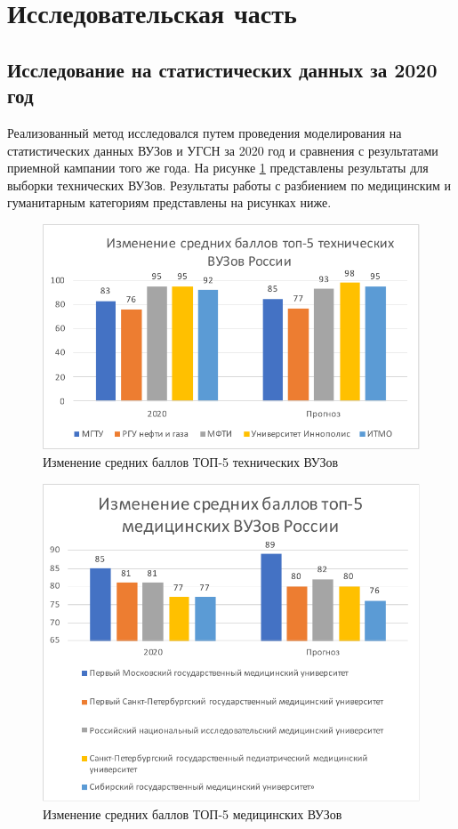 \section{Исследовательская часть}

\subsection{Исследование на статистических данных за 2020 год}

Реализованный метод исследовался путем проведения моделирования на статистических данных ВУЗов и УГСН за 2020 год и сравнения с результатами приемной кампании того же года. На рисунке \ref{top5tech} представлены результаты для выборки технических ВУЗов. Результаты работы с разбиением по медицинским и гуманитарным категориям представлены на рисунках ниже.

\begin{figure}[hbtp]
	\centering
	\includegraphics[scale=1.0]{img/top5tech.pdf.pdf}
	\caption{Изменение средних баллов ТОП-5 технических ВУЗов}
	\label{top5tech}
\end{figure} 

\begin{figure}[hbtp]
	\centering
	\includegraphics[scale=1.0]{img/top5med.pdf.pdf}
	\caption{Изменение средних баллов ТОП-5 медицинских ВУЗов}
	\label{top5med}
\end{figure} 

